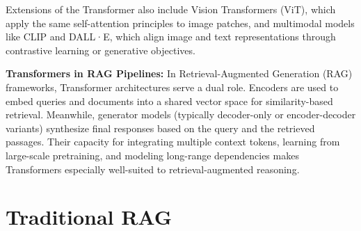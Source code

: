 \documentclass[12pt,twoside]{report}
\begin{document}
Extensions of the Transformer also include Vision Transformers (ViT)\cite{ViT}, which apply the same self-attention principles to image patches, and multimodal models like CLIP\cite{CLIP} and DALL·E\cite{DALL.E-2}, which align image and text representations through contrastive learning or generative objectives.

\textbf{Transformers in RAG Pipelines:}
In Retrieval-Augmented Generation (RAG) frameworks, Transformer architectures serve a dual role. Encoders are used to embed queries and documents into a shared vector space for similarity-based retrieval. Meanwhile, generator models (typically decoder-only or encoder-decoder variants) synthesize final responses based on the query and the retrieved passages. Their capacity for integrating multiple context tokens, learning from large-scale pretraining, and modeling long-range dependencies makes Transformers especially well-suited to retrieval-augmented reasoning.

\section{Traditional RAG}
\end{document}
